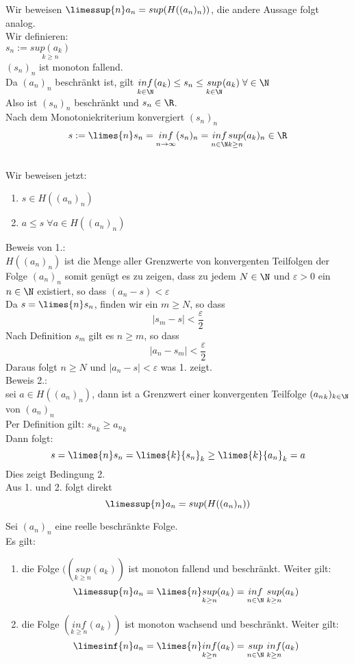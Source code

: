 \documentclass[12pt,a4paper,titlepage,draft]{article}
\begin{document}
	\begin{bew}
		Wir beweisen \(\limessup{n} a_n = sup(H((a_n)_n))\), die andere Aussage folgt analog.\\
		Wir definieren:\\
		\(s_n := \underset{k \geq n}{sup(a_k)}\)\\
		\((s_n)_n\) ist monoton fallend.\\
		Da \((a_n)_n\) beschränkt ist, gilt \(\underset{k \in \N}{inf}(a_k) \leq s_n \leq \underset{k \in \N}{sup}(a_k) \; \forall \in \N\)\\
		Also ist \((s_n)_n\) beschränkt und \(s_n \in \R\).\\
		Nach dem Monotoniekriterium konvergiert \((s_n)_n\)\\
		\[s := \limes{n} s_n = \underset{n \rightarrow \infty}{inf}(s_n)_n = \underset{n \in \N}{inf}\underset{k \geq n}{sup}(a_k)_n \in \R\]\\
		Wir beweisen jetzt:
		\begin{enumerate}
			\item \(s \in H((a_n)_n)\)
			\item \(a \leq s \; \forall a \in H((a_n)_n)\)
		\end{enumerate}
		Beweis von 1.:\\
		\(H((a_n)_n)\) ist die Menge aller Grenzwerte von konvergenten Teilfolgen der Folge \((a_n)_n\) somit genügt es zu zeigen, dass zu jedem \(N \in \N\) und \(\varepsilon > 0\) ein \(n \in \N\) existiert, so dass \((a_n - s) < \varepsilon\)\\
		Da \(s = \limes{n} s_n\), finden wir ein \(m \geq N\), so dass 
		\[|s_m - s| < \frac{\varepsilon}{2}\]
		Nach Definition \(s_m\) gilt es \(n \geq m\), so dass
		\[|a_n - s_m| < \frac{\varepsilon}{2}\]
		Daraus folgt \(n \geq N\) und \(|a_n - s| < \varepsilon\) was 1. zeigt.\\
		Beweis 2.:\\
		sei \(a \in H((a_n)_n)\), dann ist a Grenzwert einer konvergenten Teilfolge \(({a_n}_k)_{k \in \N}\) von \((a_n)_n\)\\
		Per Definition gilt: \({s_n}_k \geq {a_n}_k\)\\
		Dann folgt:
		\[s = \limes{n} s_n = \limes{k} {s_n}_k \geq \limes{k} {a_n}_k = a\]
		Dies zeigt Bedingung 2.\\
		Aus 1. und 2. folgt direkt
		\[\limessup{n} a_n = sup(H((a_n)_n))\]
	\end{bew}
	\begin{lem}
		Sei \((a_n)_n\) eine reelle beschränkte Folge.\\
		Es gilt: 
		\begin{enumerate}
			\item 
				die Folge \(((\underset{k \geq n}{sup}(a_k))\) ist monoton fallend und beschränkt. Weiter gilt:
				\[\limessup{n} a_n = \limes{n} \underset{k \geq n}{sup} (a_k) = \underset{n \in \N}{inf} \; \underset{k \geq n}{sup} (a_k)\]
			\item 
				die Folge \((\underset{k \geq n}{inf} (a_k))\) ist monoton wachsend und beschränkt. Weiter gilt:
				\[\limesinf{n} a_n = \limes{n} \underset{k \geq n}{inf} (a_k) = \underset{n \in \N}{sup} \; \underset{k \geq n}{inf} (a_k)\]
		\end{enumerate}		
	\end{lem}
\end{document}
